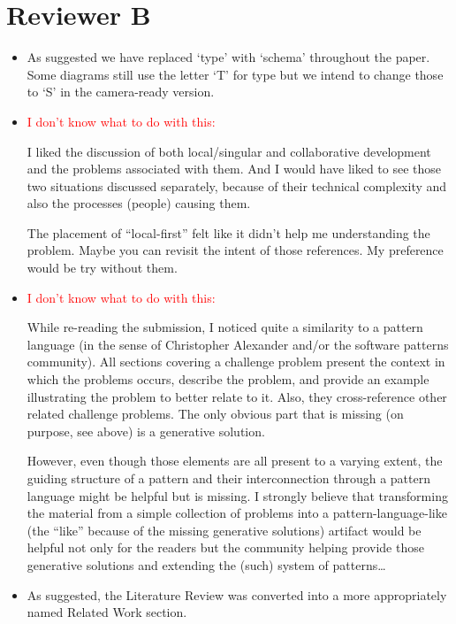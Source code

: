 \documentclass{article}
\begin{document}
\section{Reviewer B}
\begin{itemize}

  \item As suggested we have replaced `type' with `schema' throughout the paper. Some diagrams still use the letter `T' for type but we intend to change those to `S' in the camera-ready version.

  \item \textcolor{red}{I don't know what to do with this:}
\begin{displayquote}
I liked the discussion of both local/singular and collaborative development and the problems associated with them. And I would have liked to see those two situations discussed separately, because of their technical complexity and also the processes (people) causing them.

The placement of “local-first” felt like it didn’t help me understanding the problem. Maybe you can revisit the intent of those references. My preference would be try without them.
\end{displayquote}

\item \textcolor{red}{I don't know what to do with this:}
\begin{displayquote}
  While re-reading the submission, I noticed quite a similarity to a pattern language (in the sense of Christopher Alexander and/or the software patterns community). All sections covering a challenge problem present the context in which the problems occurs, describe the problem, and provide an example illustrating the problem to better relate to it. Also, they cross-reference other related challenge problems. The only obvious part that is missing (on purpose, see above) is a generative solution.

  However, even though those elements are all present to a varying extent, the guiding structure of a pattern and their interconnection through a pattern language might be helpful but is missing. I strongly believe that transforming the material from a simple collection of problems into a pattern-language-like (the “like” because of the missing generative solutions) artifact would be helpful not only for the readers but the community helping provide those generative solutions and extending the (such) system of patterns…
\end{displayquote}

\item As suggested, the Literature Review was converted into a more appropriately named Related Work section.
\end{itemize}
\end{document}
